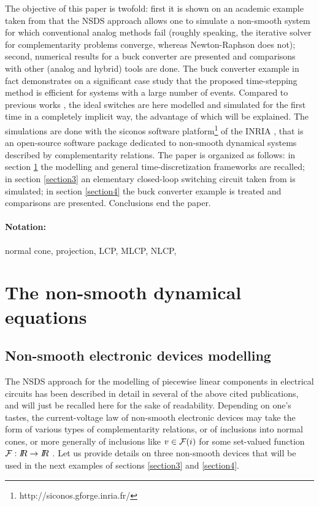 \documentclass{article}
\begin{document}
The objective of this paper is twofold: first it is shown on an academic example taken from \cite{maffezzoni2006} that the NSDS approach allows one to simulate a non-smooth system for which conventional analog methods fail (roughly speaking, the iterative solver for complementarity problems converge, whereas Newton-Raphson does not); second, numerical results for a buck converter are presented and comparisons with other (analog and hybrid) tools are done. The buck converter example in fact demonstrates on a significant case study that the proposed time-stepping method is efficient for systems with a large number of events. Compared to previous works \cite{glocker2005,vasca2009}, the ideal switches are here modelled and simulated for the first time in a completely implicit way, the advantage of which will be explained.  The simulations are done with the {\sc siconos} software platform\footnote{http://siconos.gforge.inria.fr/} of the INRIA \cite{acary-brogliato2008,Acary-Perignon2007,mathmod}, that is an open-source software package dedicated to non-smooth dynamical systems described by complementarity relations. The paper is organized as follows: in section \ref{section2} the modelling and general time-discretization frameworks are recalled; in section \ref{section3} an elementary closed-loop switching circuit taken from \cite{maffezzoni2006} is simulated; in section \ref{section4} the buck converter example is treated and comparisons are presented. Conclusions end the paper. 



\paragraph{Notation:} normal cone, projection, LCP, MLCP, NLCP,




\section{The non-smooth dynamical equations}
\label{section2}

\subsection{Non-smooth electronic devices modelling}
\label{section21}

The NSDS approach for the  modelling of piecewise linear components in electrical circuits has been described in detail  in several of the above cited publications, and will just be recalled here for the sake of readability. Depending on one's tastes, the current-voltage law of non-smooth electronic devices may take the form of various types of complementarity relations, or of inclusions into normal cones, or more generally of inclusions like $v \in {\cal F}(i)$ for some set-valued function ${\cal F}: \mbox{\rm $I\!\!R$} \rightarrow \mbox{\rm $I\!\!R$}$ \cite{adly2007,glocker2005}. Let us provide details on three non-smooth devices that will be used in the next examples of sections \ref{section3} and \ref{section4}. 
\end{document}

